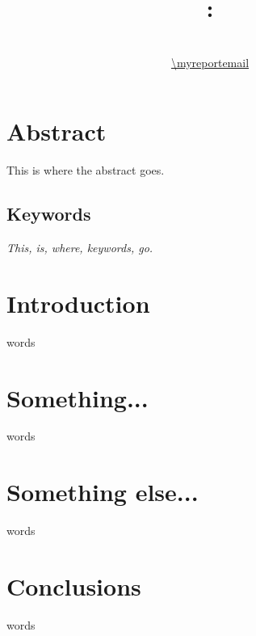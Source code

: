 \documentclass[a4paper, 11pt]{article}
\title{{\myreporttitle}: {\myreportsubtitle}\\{\normalsize\myreportproject}}
\author{\myreportname\\\url{\myreportemail}}
\begin{document}
\maketitle

\section*{Abstract} 
This is where the abstract goes.

\subsection*{Keywords}
\emph{This, is, where, keywords, go.}

\section{Introduction}
words

\section{Something...}
words

\section{Something else...}
words

\section{Conclusions}
words
\end{document}
